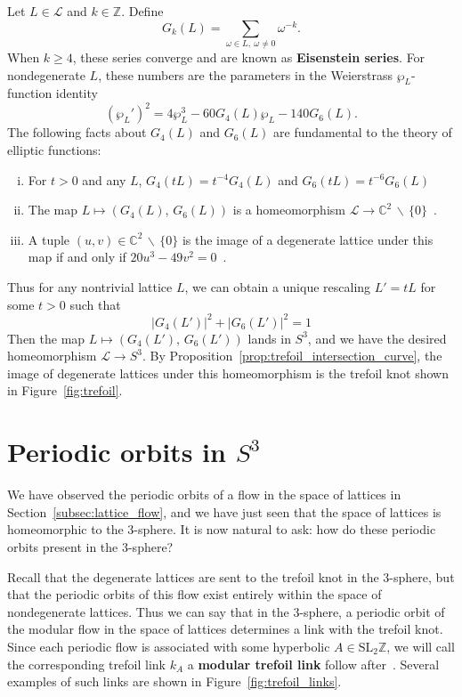 \documentclass[12pt,twoside]{reedthesis}
\theoremstyle{definition}
\newcommand{\Z}{\mathbb{Z}}
\newcommand{\C}{\mathbb{C}}
\newcommand{\LS}{\mathcal{L}}
\newcommand{\SLZ}{\mathrm{SL}_2{\Z}}
\newcommand{\wo}{\, \backslash \,}
\newcommand{\defnphrase}[1]{\textbf{#1}}
\begin{document}
Let $L \in \LS$ and $k \in \Z$.
Define
\begin{equation*}
  G_k(L) = \sum_{\omega \in L,\ \omega \neq 0} \omega^{-k}.
\end{equation*}
When $k \geq 4$, these series converge and are known as \defnphrase{Eisenstein series}.
For nondegenerate $L$, these numbers are the parameters in the Weierstrass $\wp_L$-function identity
\begin{equation*}
  (\wp_L')^2 = 4 \wp_L^3 - 60 G_4(L) \wp_L - 140 G_6(L).
\end{equation*}
The following facts about $G_4(L)$ and $G_6(L)$ are fundamental to the theory of elliptic functions:
\begin{enumerate}[(i)]
  \item For $t > 0$ and any $L$, $G_4(tL) = t^{-4} G_4(L)$ and $G_6(tL) = t^{-6} G_6(L)$~\cite[631]{abramowitz1964}
  
  \item The map $L \mapsto (G_4(L),\, G_6(L))$ is a homeomorphism $\LS \to \C^2 \wo \{ 0 \}$~\cite[82, 89]{serre1973}.

  \item A tuple $(u, v) \in \C^2 \wo \{ 0 \}$ is the image of a degenerate lattice under this map if and only if $20u^3 - 49v^2 = 0$~\cite[265]{ghys2007}.
\end{enumerate}
Thus for any nontrivial lattice $L$, we can obtain a unique rescaling $L' = tL$ for some $t > 0$ such that
\begin{equation*}
  |G_4(L')|^2 + |G_6(L')|^2 = 1
\end{equation*}
Then the map $L \mapsto (G_4(L'),\, G_6(L'))$ lands in $S^3$, and we have the desired homeomorphism $\LS \to S^3$.
By Proposition~\ref{prop:trefoil_intersection_curve}, the image of degenerate lattices under this homeomorphism is the trefoil knot shown in Figure~\ref{fig:trefoil}.

\section{Periodic orbits in $S^3$}\label{sec:periodic_orbits_in_s3}

We have observed the periodic orbits of a flow in the space of lattices in Section~\ref{subsec:lattice_flow}, and we have just seen that the space of lattices is homeomorphic to the 3-sphere.
It is now natural to ask: how do these periodic orbits present in the 3-sphere?

Recall that the degenerate lattices are sent to the trefoil knot in the 3-sphere, but that the periodic orbits of this flow exist entirely within the space of nondegenerate lattices.
Thus we can say that in the 3-sphere, a periodic orbit of the modular flow in the space of lattices determines a link with the trefoil knot.
Since each periodic flow is associated with some hyperbolic $A \in \SLZ$, we will call the corresponding trefoil link $k_A$ a \defnphrase{modular trefoil link} follow after~\cite{ghys2007}.
Several examples of such links are shown in Figure~\ref{fig:trefoil_links}.
\end{document}
